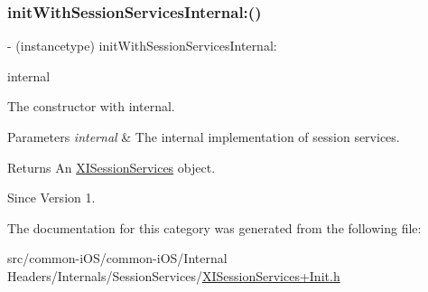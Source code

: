 \subsubsection{\texorpdfstring{init\+With\+Session\+Services\+Internal\+:()}{initWithSessionServicesInternal:()}}
{\footnotesize\ttfamily -\/ (instancetype) init\+With\+Session\+Services\+Internal\+: \begin{DoxyParamCaption}\item[{(\hyperlink{interface_x_i_session_services_internal}{X\+I\+Session\+Services\+Internal} $\ast$)}]{internal }\end{DoxyParamCaption}}



The constructor with internal. 


\begin{DoxyParams}{Parameters}
{\em internal} & The internal implementation of session services. \\
\hline
\end{DoxyParams}
\begin{DoxyReturn}{Returns}
An \hyperlink{interface_x_i_session_services}{X\+I\+Session\+Services} object. 
\end{DoxyReturn}
\begin{DoxySince}{Since}
Version 1. 
\end{DoxySince}


The documentation for this category was generated from the following file\+:\begin{DoxyCompactItemize}
\item 
src/common-\/i\+O\+S/common-\/i\+O\+S/\+Internal Headers/\+Internals/\+Session\+Services/\hyperlink{_x_i_session_services_09_init_8h}{X\+I\+Session\+Services+\+Init.\+h}\end{DoxyCompactItemize}
